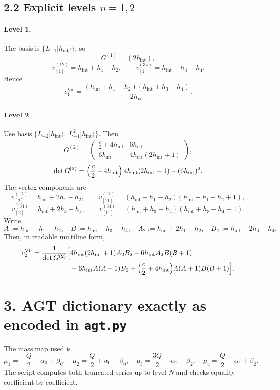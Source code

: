 \documentclass[11pt]{article}
\begin{document}
\subsection*{2.2 Explicit levels $n=1,2$}

\paragraph{Level 1.}
The basis is $\{L_{-1}|h_{\mathrm{int}}\rangle\}$, so
\[
G^{(1)}=(2h_{\mathrm{int}}),
\]
\[
v^{(12)}_{[1]}=h_{\mathrm{int}}+h_1-h_2,\qquad
v^{(34)}_{[1]}=h_{\mathrm{int}}+h_3-h_4.
\]
Hence
\[
c^{\mathrm{Vir}}_1=
\frac{(h_{\mathrm{int}}+h_1-h_2)(h_{\mathrm{int}}+h_3-h_4)}{2h_{\mathrm{int}}}.
\]

\paragraph{Level 2.}
Use basis $\{L_{-2}|h_{\mathrm{int}}\rangle,\;L_{-1}^2|h_{\mathrm{int}}\rangle\}$.
Then
\[
G^{(2)}=
\begin{pmatrix}
\frac c2+4h_{\mathrm{int}} & 6h_{\mathrm{int}}\\
6h_{\mathrm{int}} & 4h_{\mathrm{int}}(2h_{\mathrm{int}}+1)
\end{pmatrix},
\]
\[
\det G^{(2)}=
\Bigl(\frac c2+4h_{\mathrm{int}}\Bigr)\,4h_{\mathrm{int}}(2h_{\mathrm{int}}+1)
-(6h_{\mathrm{int}})^2.
\]
The vertex components are
\[
v^{(12)}_{[2]}=h_{\mathrm{int}}+2h_1-h_2,\qquad
v^{(12)}_{[11]}=(h_{\mathrm{int}}+h_1-h_2)(h_{\mathrm{int}}+h_1-h_2+1),
\]
\[
v^{(34)}_{[2]}=h_{\mathrm{int}}+2h_3-h_4,\qquad
v^{(34)}_{[11]}=(h_{\mathrm{int}}+h_3-h_4)(h_{\mathrm{int}}+h_3-h_4+1).
\]
Write
\[
A:=h_{\mathrm{int}}+h_1-h_2,\quad
B:=h_{\mathrm{int}}+h_3-h_4,\quad
A_2:=h_{\mathrm{int}}+2h_1-h_2,\quad
B_2:=h_{\mathrm{int}}+2h_3-h_4.
\]
Then, in readable multiline form,
\begin{align*}
c^{\mathrm{Vir}}_2
=\frac{1}{\det G^{(2)}}\Bigl[
&4h_{\mathrm{int}}(2h_{\mathrm{int}}+1)A_2B_2
-6h_{\mathrm{int}}A_2B(B+1)\\
&-6h_{\mathrm{int}}A(A+1)B_2
+\Bigl(\frac c2+4h_{\mathrm{int}}\Bigr)A(A+1)B(B+1)
\Bigr].
\end{align*}

\section*{3. AGT dictionary exactly as encoded in \texttt{agt.py}}

The mass map used is
\[
\mu_1=-\frac Q2+\alpha_0+\beta_0,
\quad
\mu_2=\frac Q2+\alpha_0-\beta_0,
\quad
\mu_3=\frac{3Q}{2}-\alpha_1-\beta_2,
\quad
\mu_4=\frac Q2-\alpha_1+\beta_2.
\]
The script computes both truncated series up to level $N$ and checks equality coefficient by coefficient.
\end{document}
